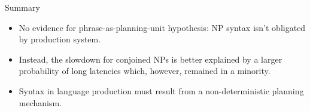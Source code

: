 
\begin{frame}{Summary}
	\begin{itemize}
		\item No evidence for phrase-as-planning-unit hypothesis: NP syntax isn't obligated by production system.
		\item Instead, the slowdown for conjoined NPs \parencite[as in][]{martin2010planning,smi99} is better explained by a larger probability of long latencies which, however, remained in a minority.
		\item Syntax in language production must result from a non-deterministic planning mechanism.		
	\end{itemize}
\end{frame}

\begin{comment}
\begin{frame}{Alternative explanations}
	\begin{itemize}
		\item[i.] Lexical preplanning: avoidance of intra-sentential pausing.
		\item[ii.] Syntactic correction of incorrectly activated NP syntax.
		\item[iii.] Both: use of syntactic route, instead of a lexical route, leads to a slowdown in conjoined NPs but not in simple NPs. 
	\end{itemize}
\end{frame}
\end{comment}

